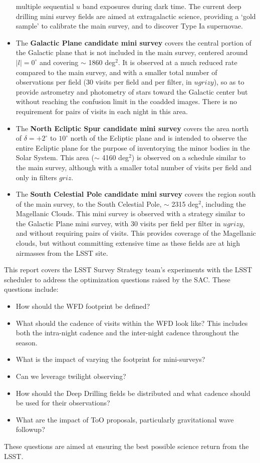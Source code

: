 \begin{itemize}
multiple sequential $u$ band exposures during dark time. The current deep drilling mini survey fields are aimed at extragalactic
science, providing a `gold sample' to calibrate the main survey, and to discover Type Ia supernovae. 
\item The {\bf Galactic Plane candidate mini survey} covers the central portion of the Galactic plane that is not included in the main survey, 
centered around $|l| = 0^\circ$ and covering $\sim$ 1860 deg$^2$.  It is observed at a much reduced rate compared to the main survey, 
and with a smaller total number of observations per field (30 visits per field and per filter, in $ugrizy$), so as to
provide astrometry and photometry of stars toward the Galactic center but without reaching the confusion limit in the coadded images.
There is no requirement for pairs of visits in each night in this area.
\item The {\bf North Ecliptic Spur candidate mini survey} covers the area north of $\delta = +2^\circ$ to $10^\circ$ north of the Ecliptic plane
and is intended to observe the entire Ecliptic plane for the purpose of inventorying the minor bodies in the Solar System. This area ($\sim$ 4160 deg$^2$) 
is observed on a schedule similar to the main survey, although with a smaller total number of visits per field and only in filters $griz$. 
\item The {\bf South Celestial Pole candidate mini survey} covers the region south of the main survey, to the South Celestial Pole, $\sim$ 2315 deg$^2$,
including the Magellanic Clouds. 
This mini survey is observed with a strategy similar to the Galactic Plane mini survey, with 30 visits per field per filter in $ugrizy$, 
and without requiring pairs of visits. This provides coverage of the Magellanic clouds, but without committing extensive time as these fields are
at high airmasses from the LSST site.
\end{itemize}

This report covers the LSST Survey Strategy team's experiments with the LSST scheduler to address the optimization questions raised by the SAC. These questions include:
\begin{itemize}
\item How should the WFD footprint be defined?
\item What should the cadence of visits within the WFD look like? This includes both the intra-night cadence and the inter-night cadence throughout the season.
\item What is the impact of varying the footprint for mini-surveys?
\item Can we leverage twilight observing?
\item How should the Deep Drilling fields be distributed and what cadence should be used for their observations?
\item What are the impact of ToO proposals, particularly gravitational wave followup?
\end{itemize}

These questions are aimed at ensuring the best possible science return from the LSST. 

